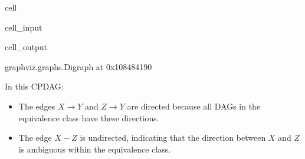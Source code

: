 \documentclass[letterpaper,10pt,english]{jupyterBook}
\begin{document}
\begin{sphinxuseclass}{cell}\begin{sphinxVerbatimInput}

\begin{sphinxuseclass}{cell_input}
\begin{sphinxVerbatim}[commandchars=\\\{\}]
  
 
 
    
\end{sphinxVerbatim}

\end{sphinxuseclass}\end{sphinxVerbatimInput}
\begin{sphinxVerbatimOutput}

\begin{sphinxuseclass}{cell_output}
\begin{sphinxVerbatim}[commandchars=\\\{\}]
\PYGZlt{}graphviz.graphs.Digraph at 0x108484190\PYGZgt{}
\end{sphinxVerbatim}

\end{sphinxuseclass}\end{sphinxVerbatimOutput}

\end{sphinxuseclass}
\sphinxAtStartPar
In this CPDAG:
\begin{itemize}
\item {} 
\sphinxAtStartPar
The edges \(X \to Y\) and \(Z \to Y\) are directed because all DAGs in the equivalence class have these directions.

\item {} 
\sphinxAtStartPar
The edge \(X - Z\) is undirected, indicating that the direction between \(X\) and \(Z\) is ambiguous within the equivalence class.

\end{itemize}
\end{document}
